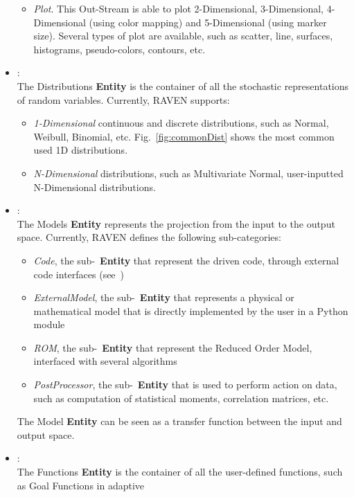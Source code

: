 \begin{itemize}
\begin{itemize}
       \item \textit{Plot}. This Out-Stream is able to plot 2-Dimensional, 3-Dimensional, 4-Dimensional (using color
       mapping) and 5-Dimensional (using marker size). Several types of plot are available, such as scatter, line, surfaces,
       histograms, pseudo-colors, contours, etc.
      \end{itemize}
  \item \textit{}:
  \\ The Distributions \textbf{Entity} is the container of all the stochastic representations of random variables. Currently,
  RAVEN supports:
      \begin{itemize}
       \item \textit{1-Dimensional} continuous and discrete distributions, such as Normal, Weibull, Binomial, etc.
         Fig.~\ref{fig:commonDist} shows the most common used 1D distributions.
       \item \textit{N-Dimensional} distributions, such as Multivariate Normal, user-inputted N-Dimensional distributions.
      \end{itemize}
  \item \textit{}:
  \\ The Models \textbf{Entity}  represents the projection from the input to the output space. Currently, RAVEN defines the
  following sub-categories:
      \begin{itemize}
       \item \textit{Code}, the sub-~\textbf{Entity} that represent the driven code, through external code interfaces (see~\cite{RAVENuserManual})
       \item  \textit{ExternalModel}, the sub-~\textbf{Entity} that represents a physical or mathematical model that is
       directly implemented by the user in a Python module
      \item \textit{ROM}, the sub-~\textbf{Entity} that represent the Reduced Order Model, interfaced with several algorithms
       \item \textit{PostProcessor}, the sub-~\textbf{Entity} that is used to perform action on data, such as computation of
       statistical moments, correlation matrices, etc.
      \end{itemize}
      The Model \textbf{Entity} can be seen as a transfer function between the input and output space.
  \item \textit{}:
   \\ The Functions \textbf{Entity} is the container of all the user-defined functions, such as Goal Functions in adaptive

\end{itemize}
